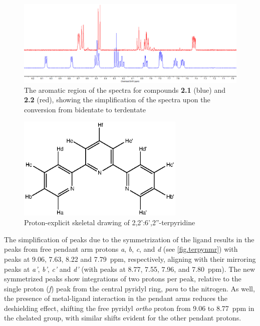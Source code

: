 \begin{figure}[!htb]
 \begin{center}
  \includegraphics[clip=true, width=\textwidth, keepaspectratio]{images/bidternmr.eps}
 \end{center}
\caption[The aromatic region of the \texorpdfstring{}{1H}  spectra showing bidentate - terdentate conversion]{The aromatic region of the \texorpdfstring{}{1H}  spectra for compounds \textbf{2.1} (blue) and \textbf{2.2} (red), showing the simplification of the spectra upon the conversion from bidentate to terdentate}
\label{fig.bidtoter}
\end{figure} 

\begin{figure}[!htb]
 \begin{center}
  \includegraphics[clip=true, width=80mm, keepaspectratio]{images/expandedterpyridine.eps}
 \end{center}
\caption[Proton-explicit skeletal drawing of 2,2':6',2''-terpyridine]{Proton-explicit skeletal drawing of 2,2':6',2''-terpyridine}
\label{fig.terpynmr}
\end{figure} 

The simplification of peaks due to the symmetrization of the ligand results in the peaks from free pendant arm protons \textit{a}, \textit{b}, \textit{c}, and \textit{d} (see \autoref{fig.terpynmr}) with peaks at 9.06, 7.63, 8.22 and 7.79~ppm, respectively, aligning with their mirroring peaks at \textit{a'}, \textit{b'}, \textit{c'} and \textit{d'} (with peaks at 8.77, 7.55, 7.96, and 7.80~ppm). The new symmetrized peaks show integrations of two protons per peak, relative to the single proton (\textit{f}) peak from the central pyridyl ring, \textit{para} to the nitrogen. As well, the presence of metal-ligand interaction in the pendant arms reduces the deshielding effect, shifting the free pyridyl \textit{ortho} proton from 9.06 to 8.77~ppm in the chelated group, with similar shifts evident for the other pendant protons.

